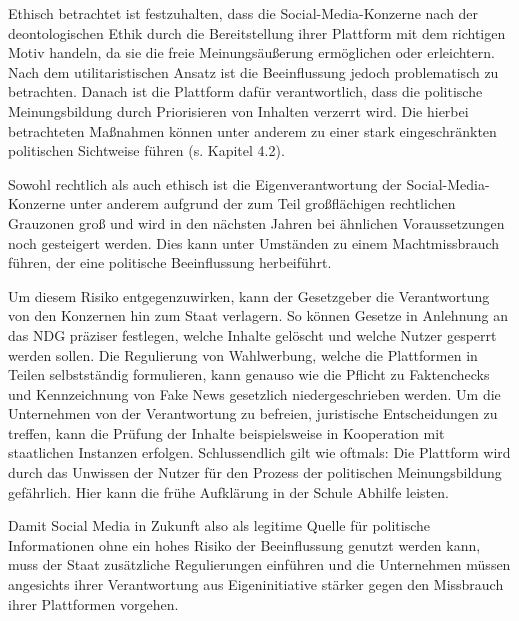 Ethisch betrachtet ist festzuhalten, dass die Social-Media-Konzerne nach der deontologischen Ethik durch die Bereitstellung ihrer Plattform mit dem richtigen Motiv handeln, da sie die freie Meinungsäußerung ermöglichen oder erleichtern. Nach dem utilitaristischen Ansatz ist die Beeinflussung jedoch problematisch zu betrachten. Danach ist die Plattform dafür verantwortlich, dass die politische Meinungsbildung durch Priorisieren von Inhalten verzerrt wird. Die hierbei betrachteten Maßnahmen können unter anderem zu einer stark eingeschränkten politischen Sichtweise führen (s. Kapitel 4.2). 

Sowohl rechtlich als auch ethisch ist die Eigenverantwortung der Social-Media-Konzerne unter anderem aufgrund der zum Teil großflächigen rechtlichen Grauzonen groß und wird in den nächsten Jahren bei ähnlichen Voraussetzungen noch gesteigert werden. Dies kann unter Umständen zu einem Machtmissbrauch führen, der eine politische Beeinflussung herbeiführt.

Um diesem Risiko entgegenzuwirken, kann der Gesetzgeber die Verantwortung von den Konzernen hin zum Staat verlagern. So können Gesetze in Anlehnung an das NDG präziser festlegen, welche Inhalte gelöscht und welche Nutzer gesperrt werden sollen. Die Regulierung von Wahlwerbung, welche die Plattformen in Teilen selbstständig formulieren, kann genauso wie die Pflicht zu Faktenchecks und Kennzeichnung von Fake News gesetzlich niedergeschrieben werden. Um die Unternehmen von der Verantwortung zu befreien, juristische Entscheidungen zu treffen, kann die Prüfung der Inhalte beispielsweise in Kooperation mit staatlichen Instanzen erfolgen. Schlussendlich gilt wie oftmals: Die Plattform wird durch das Unwissen der Nutzer für den Prozess der politischen Meinungsbildung gefährlich. Hier kann die frühe Aufklärung in der Schule Abhilfe leisten. 

Damit Social Media in Zukunft also als legitime Quelle für politische Informationen ohne ein hohes Risiko der Beeinflussung genutzt werden kann, muss der Staat zusätzliche Regulierungen einführen und die Unternehmen müssen angesichts ihrer Verantwortung aus Eigeninitiative stärker gegen den Missbrauch ihrer Plattformen vorgehen.


